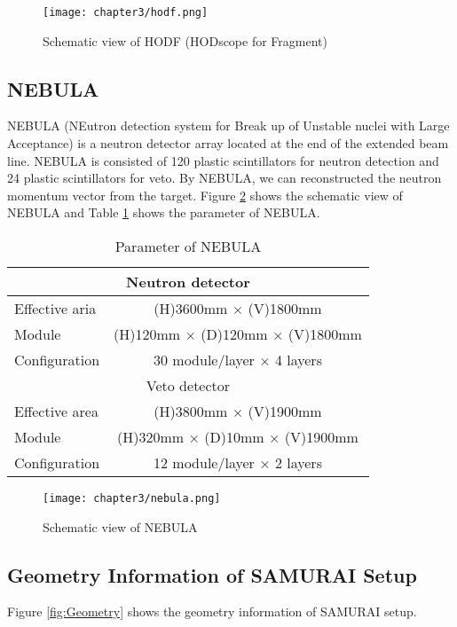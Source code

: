\clearpage

\begin{figure}[h]
    \centering
    \texttt{[image: chapter3/hodf.png]}
    \caption{Schematic view of HODF (HODscope for Fragment) \cite{SAMURAI}}
    \label{fig:HODF}
\end{figure}

\subsection{NEBULA}
NEBULA (NEutron detection system for Break up of Unstable nuclei with Large Acceptance) is a neutron detector array located at the end of the extended beam line. NEBULA is consisted of 120 plastic scintillators for neutron detection and 24 plastic scintillators for veto. By NEBULA, we can reconstructed the neutron momentum vector from the target. Figure \ref{fig:NEBULA} shows the schematic view of NEBULA and Table \ref{tab:NEBULA} shows the parameter of NEBULA.

\begin{table}[h]
    \centering
    \begin{tabular}{l|c}
        \hline
        \multicolumn{2}{c}{Neutron detector}\\
        \hline
        Effective aria & (H)3600mm $\times$ (V)1800mm\\
        Module & (H)120mm $\times$ (D)120mm $\times$ (V)1800mm\\
        Configuration & 30 module/layer $\times$ 4 layers \\
        \hline
        \multicolumn{2}{c}{Veto detector} \\
        \hline
        Effective area & (H)3800mm $\times$ (V)1900mm\\
        Module & (H)320mm $\times$ (D)10mm $\times$ (V)1900mm\\
        Configuration & 12 module/layer $\times$ 2 layers \\
        \hline
    \end{tabular}
    \caption{Parameter of NEBULA \cite{SAMURAI}}
    \label{tab:NEBULA}
\end{table}

\begin{figure}[h]
    \centering
    \texttt{[image: chapter3/nebula.png]}
    \caption{Schematic view of NEBULA \cite{SAMURAI}}
    \label{fig:NEBULA}
\end{figure}

\subsection{Geometry Information of SAMURAI Setup}
Figure \ref{fig:Geometry} shows the geometry information of SAMURAI setup\cite{Dayonewiki}.


